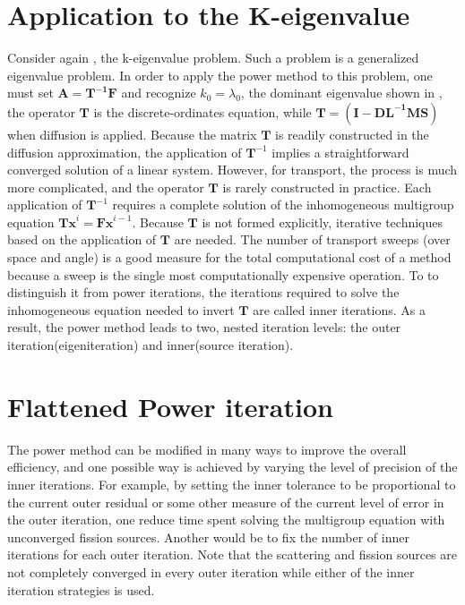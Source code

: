 \section{Application to the K-eigenvalue}

Consider again , the k-eigenvalue problem.
Such a problem is a generalized eigenvalue problem.
In order to apply the power method to this problem, one must set $\mathbf{A=T^{-1}F}$ and recognize $k_0= \lambda_0$, the dominant eigenvalue shown in , the operator $\mathbf{T}$ is the discrete-ordinates equation, while $\mathbf{T} = (\mathbf{I  - DL^{-1}MS})$ when diffusion is applied.
Because the matrix $\mathbf{T}$ is readily constructed in the diffusion approximation, the application of $\mathbf{T}^{-1}$ implies a straightforward converged solution of a linear system. 
However, for transport, the process is much more complicated, and the operator $\mathbf{T}$ is rarely constructed in practice.
Each application of $\mathbf{T}^{-1}$ requires a complete solution of the inhomogeneous multigroup equation $\mathbf{Tx}^{i} = \mathbf{Fx}^{i-1}$.
Because $\mathbf{T}$ is not formed explicitly, iterative techniques based on the application of $\mathbf{T}$ are needed. 
The number of transport sweeps (over space and angle) is a good measure for the total computational cost of a method because a sweep is the single most computationally expensive operation.
To to distinguish it from power iterations, the iterations required to solve the inhomogeneous equation needed to invert $\mathbf{T}$ are called inner iterations.
As a result, the power method leads to two, nested iteration levels: the outer iteration(eigeniteration) and inner(source iteration).

\section{Flattened Power iteration}

The power method can be modified in many ways to improve the overall efficiency, and one possible way is achieved by varying the level of precision of the inner iterations.
For example, by setting the inner tolerance to be proportional to the current outer residual or some other measure of the current level of error in the outer iteration, one reduce time spent solving the multigroup equation with unconverged fission sources.
Another would be to fix the number of inner iterations for each outer iteration.
Note that the scattering and fission sources are not completely converged in every outer iteration while either of the inner iteration strategies is used.
\citep{gill_newtons_2011}

